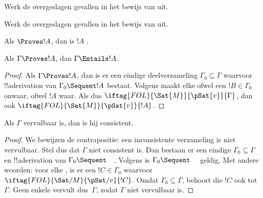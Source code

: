 \documentclass[openany]{memoir}
\begin{document}
\begin{prob}
Werk de overgeslagen gevallen in het bewijs van
 uit.
\end{prob}
\tagendprob

\begin{prob}
Werk de overgeslagen gevallen in het bewijs van
 uit.
\end{prob}
\tagendprob

\begin{cor}
Als $\Proves !A$, dan is $!A$ .
\end{cor}

\begin{cor}
Als $\Gamma \Proves !A$, dan $\Gamma \Entails !A$.
\end{cor}

\begin{proof}
Als $\Gamma \Proves !A$, dan is er een eindige deelverzameling
$\Gamma_0 \subseteq \Gamma$ waarvoor !!a{derivation} van
$\Gamma_0 \Sequent !A$ bestaat. Volgens
 maakt elke
ofwel een $!B \in \Gamma_0$ onwaar, ofwel $!A$ waar. Als dus
$\iftag{FOL}{\Sat{M}}{\pSat{v}}{\Gamma}$, dan ook
$\iftag{FOL}{\Sat{M}}{\pSat{v}}{!A}$.
\end{proof}

\begin{cor}
Als $\Gamma$ vervulbaar is, dan is hij consistent.
\end{cor}

\begin{proof}
We bewijzen de contrapositie: een inconsistente verzameling is niet
vervulbaar. Stel dus dat $\Gamma$ niet consistent is.
Dan bestaan er een eindige $\Gamma_0 \subseteq \Gamma$ en
!!a{derivation} van $\Gamma_0 \Sequent \quad$. Volgens
 is $\Gamma_0 \Sequent \quad$ geldig.
Met andere woorden: voor elke
,
is er een $!C \in \Gamma_0$ waarvoor
$\iftag{FOL}{\Sat/{M}}{\pSat/{v}}{!C}$. Omdat $\Gamma_0 \subseteq
\Gamma$, behoort die $!C$ ook tot~$\Gamma$. Geen enkele
 vervult dus~$\Gamma$, zodat
$\Gamma$ niet vervulbaar is.
\end{proof}
\endgroup
\end{document}

